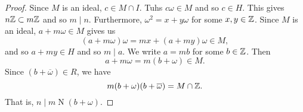 \begin{proof}
	Since $M$ is an ideal, $c \in M \cap I$.
	Tuhs $c \omega \in M$ and so $c \in H$.
	This gives $n \mathbb{Z} \subset m\mathbb{Z}$ and so $m \mid n$.
	Furthermore, $\omega^2 = x + y\omega$ for some $x, y \in \mathbb{Z}$.
	Since $M$ is an ideal, $a + m\omega \in M$
	gives us
	\[
		(a + m\omega)\omega = mx + (a + my) \omega \in M,
	\]
	and so $a + my \in H$ and so $m \mid a$.
	We write $a = mb$ for some $b \in \mathbb{Z}$.
	Then
	\[
		a + m\omega = m(b + \omega) \in M.
	\]
	Since $(b + \overline\omega) \in R$, we have
	\[
		m(b + \omega)(b + \overline\omega) = M \cap \mathbb{Z}.
	\]
	That is, $n \mid m\operatorname{N}(b+\omega)$.  
\end{proof}
